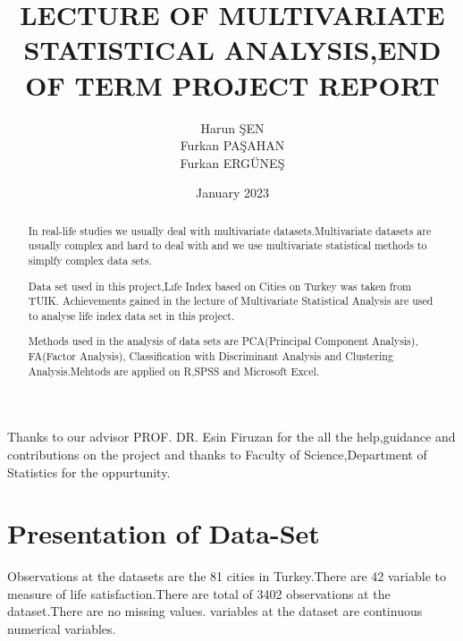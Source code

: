 \documentclass[12pt,twoside]{deuthesis}
\title{LECTURE OF MULTIVARIATE STATISTICAL ANALYSIS,END OF TERM PROJECT REPORT}
\author{Harun ŞEN \\ Furkan PAŞAHAN \\ Furkan ERGÜNEŞ} %
\date{January 2023}
\begin{document}
  \maketitle

\frontmatter %
\pagestyle{empty} %

  \begin{acknowledgements}
    Thanks to our advisor PROF. DR. Esin Firuzan for the all the help,guidance and contributions on the project and thanks to Faculty of Science,Department of Statistics for the oppurtunity.
  \end{acknowledgements}
\begin{abstract}
	In real-life studies we usually deal with multivariate datasets.Multivariate datasets are usually complex and hard to deal with and we use multivariate statistical methods to simplfy complex data sets.

Data set used in this project,Lıfe Index based on Cities on Turkey was taken from TUIK.
Achievements gained in the lecture of Multivariate Statistical Analysis are used to analyse life index data set in this project.

Methods used in the analysis of data sets are PCA(Principal Component Analysis), FA(Factor Analysis), Classification with Discriminant Analysis and Clustering Analysis.Mehtods are applied on R,SPSS and Microsoft Excel.
\end{abstract}

  \hypersetup{linkcolor=black}
  \setcounter{tocdepth}{2}
  \tableofcontents




\newlength{\cslhangindent}
\setlength{\cslhangindent}{1.5em}
\newenvironment{CSLReferences}%
  {}%
  {\par}
\newenvironment{cslreferences}%
  {}%
  {\par}

\mainmatter %
\pagestyle{fancyplain} %

\hypertarget{rmd-basics}{%
\chapter{Presentation of Data-Set}\label{rmd-basics}}

Observations at the datasets are the 81 cities in Turkey.There are 42 variable to measure of life satisfaction.There are total of 3402 observations at the dataset.There are no missing values.
variables at the dataset are continuous numerical variables.
\end{document}
